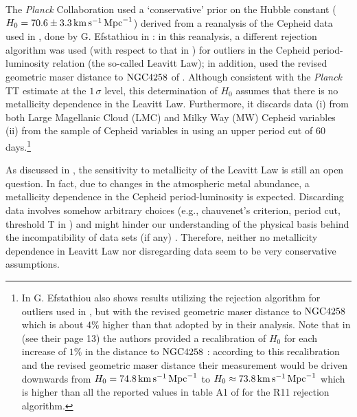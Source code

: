 The \textit{Planck} Collaboration used a `conservative' prior on the Hubble constant ($H_0=70.6\pm3.3\, \mathrm{km}\, \mathrm{s}^{-1}\, \mathrm{Mpc}^{-1}$) derived from a reanalysis of the Cepheid data used in \cite{Riess:2011yx}, done by G. Efstathiou in \cite{Efstathiou:2013via}: in this reanalysis, a different rejection algorithm was used (with respect to that in \cite{Riess:2011yx}) for outliers in the Cepheid period-luminosity relation (the so-called Leavitt Law); in addition, \cite{Efstathiou:2013via} used the revised geometric maser distance to $\mathrm{NGC4258}$ of \cite{Humphreys:2013eja}. Although consistent with the \textit{Planck} TT estimate at the $1\, \sigma$ level, this determination of $H_0$ assumes that there is no metallicity dependence in the Leavitt Law. Furthermore, it discards data (i) from both Large Magellanic Cloud (LMC) and Milky Way (MW) Cepheid variables (ii) from the sample of Cepheid variables in \cite{Riess:2011yx} using an upper period cut of $60$ days.\footnote{In \cite{Efstathiou:2013via} G. Efstathiou also shows results utilizing the rejection algorithm for outliers used in \cite{Riess:2011yx}, but with the revised geometric maser distance to $\mathrm{NGC4258}$ \cite{Humphreys:2013eja} which is about $4\%$ higher than that adopted by \cite{Riess:2011yx} in their analysis. Note that in \cite{Riess:2011yx} (see their page 13) the authors provided a recalibration of $H_0$ for each increase of $1\%$ in the distance to $\mathrm{NGC4258}$ : according to this recalibration and the revised geometric maser distance their measurement would be driven downwards from $H_0 = 74.8\, \mathrm{km} \, \mathrm{s}^{-1}\, \mathrm{Mpc}^{-1}$ to $H_0 \approx 73.8 \, \mathrm{km} \, \mathrm{s}^{-1}\, \mathrm{Mpc}^{-1}$ which is higher than all the reported values in table A1 of \cite{Efstathiou:2013via} for the R11 rejection algorithm.}

As discussed in \cite{Freedman:2010xv}, the sensitivity to metallicity of the Leavitt Law is still an open question. In fact, due to changes in the atmospheric metal abundance, a metallicity dependence in the Cepheid period-luminosity is expected. Discarding data involves somehow arbitrary choices (e.g., chauvenet's criterion, period cut, threshold T in \cite{Efstathiou:2013via}) and might hinder our understanding of the physical basis behind the incompatibility of data sets (if any) \cite{Press:1996fw}. Therefore, neither no metallicity dependence in Leavitt Law nor disregarding data seem to be very conservative assumptions. 

